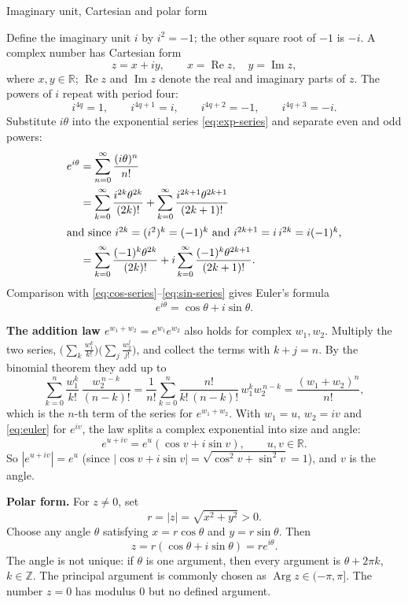 \documentclass[11pt]{beamer}
\begin{document}
\begin{frame}[allowframebreaks=1.00]{Imaginary unit, Cartesian and polar form}
\footnotesize

Define the imaginary unit $i$ by $i^2=-1$; the other square root of $-1$ is $-i$.
A complex number has Cartesian form
\[
  z=x+iy,\qquad x=\operatorname{Re}z,\quad y=\operatorname{Im}z,
\]
where $x,y\in\mathbb R$; $\operatorname{Re}z$ and $\operatorname{Im}z$ denote the real
and imaginary parts of $z$.  The powers of $i$ repeat with period four:
\[
  i^{4q}=1,\qquad i^{4q+1}=i,\qquad
  i^{4q+2}=-1,\qquad i^{4q+3}=-i.
\]
Substitute $i\theta$ into the exponential series \eqref{eq:exp-series} and separate even
and odd powers:
\begin{align*}
 e^{i\theta}
  &=\sum_{n=0}^{\infty}\frac{(i\theta)^n}{n!}\\
  &=\sum_{k=0}^{\infty}\frac{i^{2k}\theta^{2k}}{(2k)!}
    +\sum_{k=0}^{\infty}\frac{i^{2k+1}\theta^{2k+1}}{(2k+1)!}\\
 \intertext{and since $i^{2k}=(i^2)^k=(-1)^k$ and $i^{2k+1}=i\,i^{2k}=i(-1)^k$,}
  &=\sum_{k=0}^{\infty}\frac{(-1)^k\theta^{2k}}{(2k)!}
    +i\sum_{k=0}^{\infty}\frac{(-1)^k\theta^{2k+1}}{(2k+1)!}.
\end{align*}
Comparison with \eqref{eq:cos-series}--\eqref{eq:sin-series} gives Euler's formula
\begin{equation}
  e^{i\theta}=\cos\theta+i\sin\theta.
  \label{eq:euler}
\end{equation}

\textbf{The addition law \(e^{w_1+w_2}=e^{w_1}e^{w_2}\)} also holds for complex \(w_1,w_2\). Multiply the
two series, \(\bigl(\sum_k\frac{w_1^k}{k!}\bigr)\bigl(\sum_j\frac{w_2^j}{j!}\bigr)\), and collect the terms with
\(k+j=n\). By the binomial theorem they add up to
\[
 \sum_{k=0}^{n}\frac{w_1^k}{k!}\,\frac{w_2^{\,n-k}}{(n-k)!}
 =\frac1{n!}\sum_{k=0}^{n}\frac{n!}{k!\,(n-k)!}\,w_1^kw_2^{\,n-k}
 =\frac{(w_1+w_2)^n}{n!},
\]
which is the \(n\)-th term of the series for \(e^{w_1+w_2}\). With \(w_1=u\), \(w_2=iv\) and \eqref{eq:euler}
for \(e^{iv}\), the law splits a complex exponential into size and angle:
\begin{equation}
 e^{u+iv}=e^u(\cos v+i\sin v),\qquad u,v\in\mathbb R.
 \label{eq:exp-uv}
\end{equation}
So \(|e^{u+iv}|=e^u\) (since \(|\cos v+i\sin v|=\sqrt{\cos^2v+\sin^2v}=1\)), and \(v\) is the angle.
\par\framebreak\par
\textbf{Polar form.} For \(z\ne0\), set
\[
  r=|z|=\sqrt{x^2+y^2}>0.
\]
Choose any angle $\theta$ satisfying
$x=r\cos\theta$ and $y=r\sin\theta$.  Then
\begin{equation}
  z=r(\cos\theta+i\sin\theta)=re^{i\theta}.
  \label{eq:polar}
\end{equation}
The angle is not unique: if $\theta$ is one argument, then every argument is
$\theta+2\pi k$, $k\in\mathbb Z$.  The principal argument is commonly chosen as
$\operatorname{Arg}z\in(-\pi,\pi]$.
The number $z=0$ has modulus $0$ but no defined argument.


\end{frame}
\end{document}
